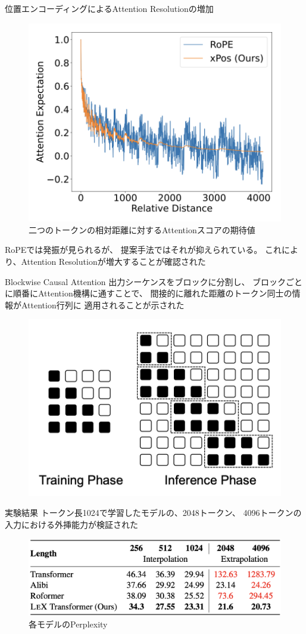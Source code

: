 \documentclass[dvipdfm, aspectratio=169]{beamer}
\begin{document}
    \begin{frame}{位置エンコーディングによるAttention Resolutionの増加}
        \begin{figure}[ht]
            \centering
            \includegraphics[width=.4\hsize]{exp.png}
            \caption{二つのトークンの相対距離に対するAttentionスコアの期待値}
        \end{figure}
        RoPEでは発振が見られるが、
        提案手法ではそれが抑えられている。
        これにより、Attention Resolutionが増大することが確認された
    \end{frame}
    \begin{frame}{Blockwise Causal Attention}
        出力シーケンスをブロックに分割し、
        ブロックごとに順番にAttention機構に通すことで、
        間接的に離れた距離のトークン同士の情報がAttention行列に
        適用されることが示された
        \begin{figure}[ht]
            \centering
            \includegraphics[width=.58\hsize]{block.png}
        \end{figure}
    \end{frame}
    \begin{frame}{実験結果}
        トークン長1024で学習したモデルの、2048トークン、
        4096トークンの入力における外挿能力が検証された
        \begin{figure}[ht]
            \caption{各モデルのPerplexity}
            \centering
            \includegraphics[width=.6\hsize]{lex.png}
        \end{figure}
    \end{frame}
\end{document}
